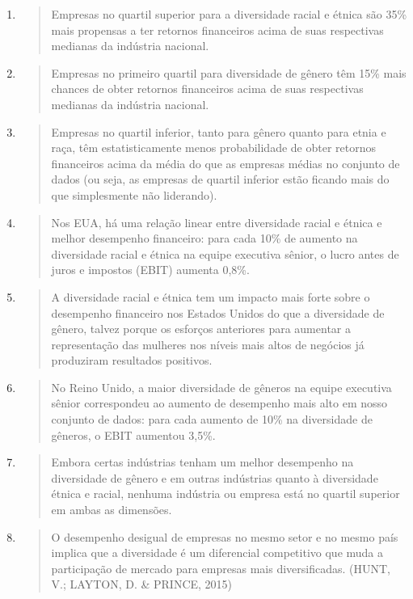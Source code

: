 \begin{enumerate}
\def\labelenumi{\arabic{enumi}.}
\item
  \begin{quote}
  Empresas no quartil superior para a diversidade racial e étnica são
  35\% mais propensas a ter retornos financeiros acima de suas
  respectivas medianas da indústria nacional.
  \end{quote}
\item
  \begin{quote}
  Empresas no primeiro quartil para diversidade de gênero têm 15\% mais
  chances de obter retornos financeiros acima de suas respectivas
  medianas da indústria nacional.
  \end{quote}
\item
  \begin{quote}
  Empresas no quartil inferior, tanto para gênero quanto para etnia e
  raça, têm estatisticamente menos probabilidade de obter retornos
  financeiros acima da média do que as empresas médias no conjunto de
  dados (ou seja, as empresas de quartil inferior estão ficando mais do
  que simplesmente não liderando).
  \end{quote}
\item
  \begin{quote}
  Nos EUA, há uma relação linear entre diversidade racial e étnica e
  melhor desempenho financeiro: para cada 10\% de aumento na diversidade
  racial e étnica na equipe executiva sênior, o lucro antes de juros e
  impostos (EBIT) aumenta 0,8\%.
  \end{quote}
\item
  \begin{quote}
  A diversidade racial e étnica tem um impacto mais forte sobre o
  desempenho financeiro nos Estados Unidos do que a diversidade de
  gênero, talvez porque os esforços anteriores para aumentar a
  representação das mulheres nos níveis mais altos de negócios já
  produziram resultados positivos.
  \end{quote}
\item
  \begin{quote}
  No Reino Unido, a maior diversidade de gêneros na equipe executiva
  sênior correspondeu ao aumento de desempenho mais alto em nosso
  conjunto de dados: para cada aumento de 10\% na diversidade de
  gêneros, o EBIT aumentou 3,5\%.
  \end{quote}
\item
  \begin{quote}
  Embora certas indústrias tenham um melhor desempenho na diversidade de
  gênero e em outras indústrias quanto à diversidade étnica e racial,
  nenhuma indústria ou empresa está no quartil superior em ambas as
  dimensões.
  \end{quote}
\item
  \begin{quote}
  O desempenho desigual de empresas no mesmo setor e no mesmo país
  implica que a diversidade é um diferencial competitivo que muda a
  participação de mercado para empresas mais diversificadas. (HUNT, V.;
  LAYTON, D. \& PRINCE, 2015)
  \end{quote}
\end{enumerate}

